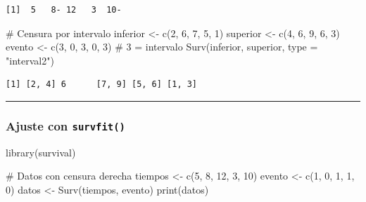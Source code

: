 \documentclass[
]{article}
\newenvironment{Shaded}{\begin{snugshade}}{\end{snugshade}}
\newcommand{\AttributeTok}[1]{\textcolor[rgb]{0.40,0.45,0.13}{#1}}
\newcommand{\CommentTok}[1]{\textcolor[rgb]{0.37,0.37,0.37}{#1}}
\newcommand{\DecValTok}[1]{\textcolor[rgb]{0.68,0.00,0.00}{#1}}
\newcommand{\FunctionTok}[1]{\textcolor[rgb]{0.28,0.35,0.67}{#1}}
\newcommand{\NormalTok}[1]{\textcolor[rgb]{0.00,0.23,0.31}{#1}}
\newcommand{\OtherTok}[1]{\textcolor[rgb]{0.00,0.23,0.31}{#1}}
\newcommand{\StringTok}[1]{\textcolor[rgb]{0.13,0.47,0.30}{#1}}
\begin{document}
\begin{verbatim}
[1]  5   8- 12   3  10-
\end{verbatim}

\begin{Shaded}
\begin{Highlighting}[]
\CommentTok{\# Censura por intervalo}
\NormalTok{inferior }\OtherTok{\textless{}{-}} \FunctionTok{c}\NormalTok{(}\DecValTok{2}\NormalTok{, }\DecValTok{6}\NormalTok{, }\DecValTok{7}\NormalTok{, }\DecValTok{5}\NormalTok{, }\DecValTok{1}\NormalTok{)}
\NormalTok{superior }\OtherTok{\textless{}{-}} \FunctionTok{c}\NormalTok{(}\DecValTok{4}\NormalTok{, }\DecValTok{6}\NormalTok{, }\DecValTok{9}\NormalTok{, }\DecValTok{6}\NormalTok{, }\DecValTok{3}\NormalTok{)}
\NormalTok{evento }\OtherTok{\textless{}{-}} \FunctionTok{c}\NormalTok{(}\DecValTok{3}\NormalTok{, }\DecValTok{0}\NormalTok{, }\DecValTok{3}\NormalTok{, }\DecValTok{0}\NormalTok{, }\DecValTok{3}\NormalTok{)  }\CommentTok{\# 3 = intervalo}
\FunctionTok{Surv}\NormalTok{(inferior, superior, }\AttributeTok{type =} \StringTok{"interval2"}\NormalTok{)}
\end{Highlighting}
\end{Shaded}

\begin{verbatim}
[1] [2, 4] 6      [7, 9] [5, 6] [1, 3]
\end{verbatim}

\begin{center}\rule{0.5\linewidth}{0.5pt}\end{center}

\subsubsection{\texorpdfstring{Ajuste con
\texttt{survfit()}}{Ajuste con survfit()}}\label{ajuste-con-survfit}

\begin{Shaded}
\begin{Highlighting}[]
\FunctionTok{library}\NormalTok{(survival)}

\CommentTok{\# Datos con censura derecha}
\NormalTok{tiempos }\OtherTok{\textless{}{-}} \FunctionTok{c}\NormalTok{(}\DecValTok{5}\NormalTok{, }\DecValTok{8}\NormalTok{, }\DecValTok{12}\NormalTok{, }\DecValTok{3}\NormalTok{, }\DecValTok{10}\NormalTok{)}
\NormalTok{evento }\OtherTok{\textless{}{-}} \FunctionTok{c}\NormalTok{(}\DecValTok{1}\NormalTok{, }\DecValTok{0}\NormalTok{, }\DecValTok{1}\NormalTok{, }\DecValTok{1}\NormalTok{, }\DecValTok{0}\NormalTok{)}
\NormalTok{datos }\OtherTok{\textless{}{-}} \FunctionTok{Surv}\NormalTok{(tiempos, evento)}
\FunctionTok{print}\NormalTok{(datos)}
\end{Highlighting}
\end{Shaded}
\end{document}
